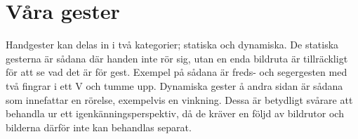 \documentclass[../rapport_MVEX01-11-05]{subfiles}
\begin{document}
\section{Våra gester}
Handgester kan delas in i två kategorier; statiska och dynamiska. De
statiska gesterna är sådana där handen inte rör sig, utan en enda
bildruta är tillräckligt för att se vad det är för gest. Exempel på
sådana är freds- och segergesten med två fingrar i ett V och tumme
upp. Dynamiska gester å andra sidan är sådana som innefattar en
rörelse, exempelvis en vinkning. Dessa är betydligt svårare att
behandla ur ett igenkänningsperspektiv, då de kräver en följd av
bildrutor och bilderna därför inte kan behandlas separat.

\begin{figure}[tb]
	\centering 
\end{figure}
\end{document}
